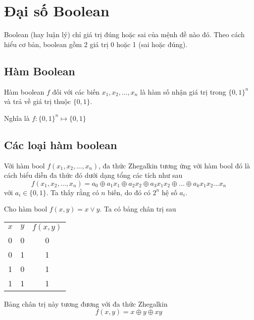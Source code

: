 \chapter{Đại số Boolean}

Boolean (hay luận lý) chỉ giá trị đúng hoặc sai của mệnh đề nào đó. 
Theo cách hiểu cơ bản, boolean gồm 2 giá trị 0 hoặc 1 (sai hoặc đúng).

\section{Hàm Boolean}

Hàm boolean $f$ đối với các biến $x_1, x_2, \ldots, x_n$ là hàm số nhận giá trị trong $\{0, 1\}^n$ và trả về giá trị thuộc $\{0, 1\}$.

Nghĩa là $f: \{0,1\}^n \mapsto \{0, 1\}$

\section{Các loại hàm boolean}

\begin{definition}
    Với hàm bool $f(x_1, x_2, \ldots, x_n)$, đa thức Zhegalkin tương ứng với hàm bool đó là cách biểu diễn
    đa thức đó dưới dạng tổng các tích như sau
    \[f(x_1, x_2, \ldots, x_n) = a_0 \oplus a_1 x_1 \oplus a_2 x_2 \oplus a_3 x_1 x_2 \oplus \ldots \oplus a_k x_1 x_2 \ldots x_n\]
    với $a_i \in \{0, 1\}$. Ta thấy rằng có $n$ biến, do đó có $2^n$ hệ số $a_i$.
\end{definition}

\begin{example}
    Cho hàm bool $f(x, y) = x \vee y$. Ta có bảng chân trị sau
    \begin{table}[ht]
        \centering
        \begin{tabular}{c c c}
            $x$ & $y$ & $f(x, y)$ \\
            0 & 0 & 0 \\
            0 & 1 & 1 \\
            1 & 0 & 1 \\
            1 & 1 & 1 \\
        \end{tabular}
    \end{table}
    Bảng chân trị này tương đương với đa thức Zhegalkin
    \[f(x, y) = x \oplus y \oplus xy\]
\end{example}
